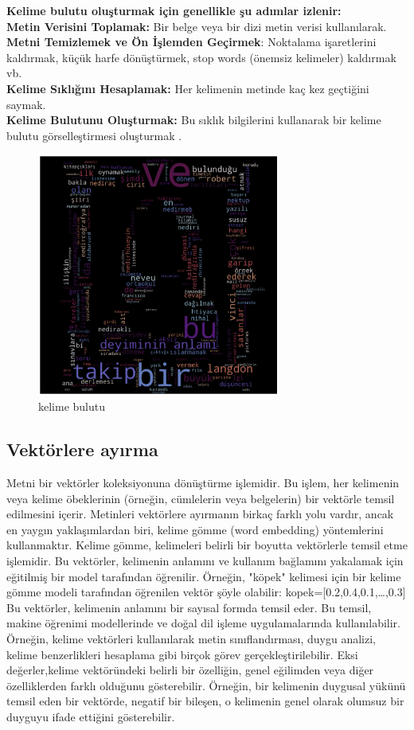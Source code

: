 \documentclass[12pt, a4paper]{article}
\begin{document}
	\textbf{Kelime bulutu oluşturmak için genellikle şu adımlar izlenir:}\\
	
	\textbf{Metin Verisini Toplamak:} Bir belge veya bir dizi metin verisi kullanılarak.\\
	\textbf{Metni Temizlemek ve Ön İşlemden Geçirmek}: Noktalama işaretlerini kaldırmak, küçük harfe dönüştürmek, stop words (önemsiz kelimeler) kaldırmak vb.\\
	\textbf{Kelime Sıklığını Hesaplamak:} Her kelimenin metinde kaç kez geçtiğini saymak.\\
	\textbf{Kelime Bulutunu Oluşturmak:} Bu sıklık bilgilerini kullanarak bir kelime bulutu görselleştirmesi oluşturmak\cite{cloud} .\\
	
	\begin{figure}[h]
		\centering
		\includegraphics[width=8cm,height=8cm]{kelimebulutu2.png}
		\caption{kelime bulutu}
		\label{bulut}
	\end{figure}
	\newpage
	
	\subsection{Vektörlere ayırma}
	Metni bir vektörler koleksiyonuna dönüştürme işlemidir. Bu işlem, her kelimenin veya kelime öbeklerinin (örneğin, cümlelerin veya belgelerin) bir vektörle temsil edilmesini içerir.
	Metinleri vektörlere ayırmanın birkaç farklı yolu vardır, ancak en yaygın yaklaşımlardan biri, kelime gömme (word embedding) yöntemlerini kullanmaktır. Kelime gömme, kelimeleri belirli bir boyutta vektörlerle temsil etme işlemidir. Bu vektörler, kelimenin anlamını ve kullanım bağlamını yakalamak için eğitilmiş bir model tarafından öğrenilir.
	Örneğin, "köpek" kelimesi için bir kelime gömme modeli tarafından öğrenilen vektör şöyle olabilir: kopek=[0.2,0.4,0.1,…,0.3]
	Bu vektörler, kelimenin anlamını bir sayısal formda temsil eder. Bu temsil, makine öğrenimi modellerinde ve doğal dil işleme uygulamalarında kullanılabilir. Örneğin, kelime vektörleri kullanılarak metin sınıflandırması, duygu analizi, kelime benzerlikleri hesaplama gibi birçok görev gerçekleştirilebilir.
	Eksi değerler,kelime vektöründeki belirli bir özelliğin, genel eğilimden veya diğer özelliklerden farklı olduğunu gösterebilir. Örneğin, bir kelimenin duygusal yükünü temsil eden bir vektörde, negatif bir bileşen, o kelimenin genel olarak olumsuz bir duyguyu ifade ettiğini gösterebilir.
	
\end{document}
